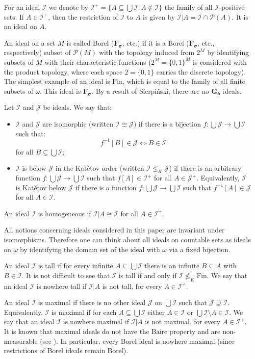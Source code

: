 \documentclass{amsart}
\theoremstyle{plain}
\theoremstyle{definition}
\theoremstyle{remark}
\newcommand{\cI}{\mathcal{I}}
\newcommand{\I}{\cI}
\newcommand{\cJ}{\mathcal{J}}
\newcommand{\J}{\cJ}
\newcommand{\cP}{\mathcal{P}}
\newcommand{\Fin}{\mathrm{Fin}}
\begin{document}
For an ideal $\I$ we denote by $\I^+=\{A\subseteq \bigcup\I: A\notin\I\}$ the family of all $\I$-positive sets. If $A\in\I^+$, then the restriction of $\I$ to $A$ is given by $\I|A=\I\cap\mathcal{P}(A)$. It is an ideal on $A$.

An ideal on a set $M$ is called Borel ($\mathbf{F_\sigma}$, etc.) if it is a Borel ($\mathbf{F_\sigma}$, etc., respectively) subset of $\cP(M)$ with the topology induced from $2^M$ by identifying subsets of $M$ with their characteristic functions ($2^M=\{0,1\}^M$ is considered with the product topology, where each space $2=\{0,1\}$ carries the discrete topology). The simplest example of an ideal is $\Fin$, which is equal to the family of all finite subsets of $\omega$. This ideal is $\mathbf{F_\sigma}$. By a result of Sierpi\'{n}ski, there are no $\mathbf{G_\delta}$ ideals. 

Let $\I$ and $\J$ be ideals. We say that:
\begin{itemize}
    \item $\I$ and $\J$ are isomorphic (written $\I\cong\J$) if there is a bijection $f:\bigcup\J\to \bigcup\I$ such that: 
    $$f^{-1}[B]\in \J \iff B\in \I$$
    for all $B\subseteq\bigcup\I$;
    \item $\I$ is below $\J$ in the Kat\v{e}tov order (written $\I\leq_K\J$) if there is an arbitrary function $f:\bigcup\J\to \bigcup\I$ such that $f[A]\in\I^+$ for all $A\in\J^+$. Equivalently, $\I$ is Kat\v{e}tov below $\J$ if there is a function $f:\bigcup\J\to\bigcup\I$ such that $f^{-1}[A]\in\J$ for all $A\in\I$.  
\end{itemize}
An ideal $\I$ is homogeneous if $\I|A\cong\I$ for all $A\in\I^+$.

All notions concerning ideals considered in this paper are invariant under isomorphisms. Therefore one can think about all ideals on countable sets as ideals on $\omega$ by identifying the domain set of the ideal with $\omega$ via a fixed bijection.  

An ideal $\I$ is tall if for every infinite $A\subseteq \bigcup\I$ there is an infinite $B\subseteq A$ with $B\in\I$. It is not difficult to see that $\I$ is tall if and only if $\I\not\leq_K\Fin$. We say that an ideal $\I$ is nowhere tall if $\I|A$ is not tall, for every $A\in\I^+$.

An ideal $\I$ is maximal if there is no other ideal $\J$ on $\bigcup\I$ such that $\J\supsetneq\I$. Equivalently, $\I$ is maximal if for each $A\subseteq\bigcup\I$ either $A\in\I$ or $\bigcup\I\setminus A\in\I$. We say that an ideal $\I$ is nowhere maximal if $\I|A$ is not maximal, for every $A\in\I^+$. It is known that maximal ideals do not have the Baire property and are non-measurable (see \cite{Sierpinski}). In particular, every Borel ideal is nowhere maximal (since restrictions of Borel ideals remain Borel). 
\end{document}
